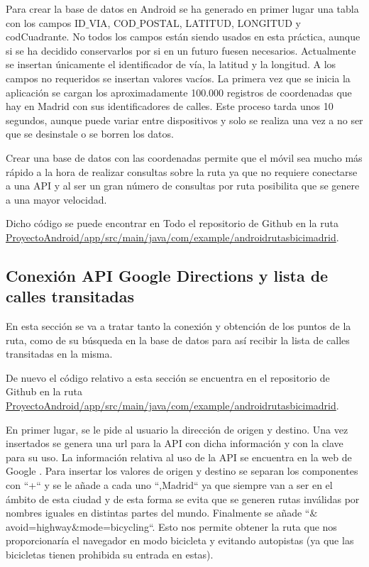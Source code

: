 Para crear la base de datos en Android se ha generado en primer lugar una tabla con los campos ID$\_$VIA, COD$\_$POSTAL, LATITUD, LONGITUD y codCuadrante. No todos los campos están siendo usados en esta práctica, aunque si se ha decidido conservarlos por si en un futuro fuesen necesarios. Actualmente se insertan únicamente el identificador de vía, la latitud y la longitud. A los campos no requeridos se insertan valores vacíos.
La primera vez que se inicia la aplicación se cargan los aproximadamente 100.000 registros de coordenadas que hay en Madrid con sus identificadores de calles. Este proceso tarda unos 10 segundos, aunque puede variar entre dispositivos y solo se realiza una vez a no ser que se desinstale o se borren los datos.

Crear una base de datos con las coordenadas permite que el móvil sea mucho más rápido a la hora de realizar consultas sobre la ruta ya que no requiere conectarse a una API y al ser un gran número de consultas por ruta posibilita que se genere a una mayor velocidad.

Dicho código se puede encontrar en Todo el repositorio de Github \cite{githubRepositorio} en la ruta \url{ProyectoAndroid/app/src/main/java/com/example/androidrutasbicimadrid}.















\clearpage
\subsection{Conexión API Google Directions y lista de calles transitadas}
En esta sección se va a tratar tanto la conexión y obtención de los puntos de la ruta, como de su búsqueda en la base de datos para así recibir la lista de calles transitadas en la misma.

De nuevo el código relativo a esta sección se encuentra en el repositorio de Github \cite{githubRepositorio} en la ruta \url{ProyectoAndroid/app/src/main/java/com/example/androidrutasbicimadrid}.

En primer lugar, se le pide al usuario la dirección de origen y destino. Una vez insertados se genera una url para la API con dicha información y con la clave para su uso. La información relativa al uso de la API se encuentra en la web de Google \cite{apiDirections}. Para insertar los valores de origen y destino se separan los componentes con ``+`` y se le añade a cada uno ``,Madrid`` ya que siempre van a ser en el ámbito de esta ciudad y de esta forma se evita que se generen rutas inválidas por nombres iguales en distintas partes del mundo. Finalmente se añade ``$\&$avoid=highway$\&$mode=bicycling``. Esto nos permite obtener la ruta que nos proporcionaría el navegador en modo bicicleta y evitando autopistas (ya que las bicicletas tienen prohibida su entrada en estas).


